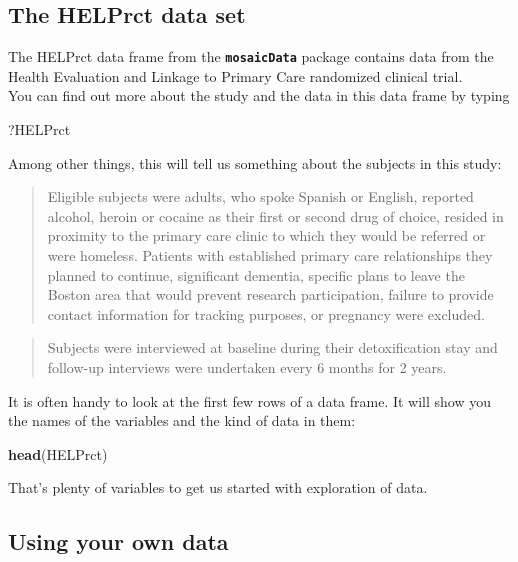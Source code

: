 \documentclass[]{book}
\newenvironment{Shaded}{\begin{snugshade}}{\end{snugshade}}
\newcommand{\KeywordTok}[1]{\textcolor[rgb]{0.13,0.29,0.53}{\textbf{#1}}}
\newcommand{\NormalTok}[1]{#1}
\begin{document}
\hypertarget{the-helprct-data-set}{%
\subsection{The HELPrct data set}\label{the-helprct-data-set}}

The {HELPrct} data frame from the \textbf{\texttt{mosaicData}} package contains data from the
Health Evaluation and Linkage to Primary Care randomized clinical trial.\\
You can find out more about the study and the data in this data frame by typing

\begin{Shaded}
\begin{Highlighting}[]
\NormalTok{?HELPrct}
\end{Highlighting}
\end{Shaded}

Among other things, this will tell us something about the subjects in this study:

\begin{quote}
Eligible subjects were adults, who spoke Spanish or English, reported
alcohol, heroin or cocaine as their first or second drug of choice, resided
in proximity to the primary care clinic to which they would be referred or
were homeless. Patients with established primary care relationships they
planned to continue, significant dementia, specific plans to leave the
Boston area that would prevent research participation, failure to provide
contact information for tracking purposes, or pregnancy were excluded.
\end{quote}

\begin{quote}
Subjects were interviewed at baseline during their detoxification stay and
follow-up interviews were undertaken every 6 months for 2 years.
\end{quote}

It is often handy to look at the first few rows of a data frame. It will show you the names of the variables and the kind of data in them:

\begin{Shaded}
\begin{Highlighting}[]
\KeywordTok{head}\NormalTok{(HELPrct)}
\end{Highlighting}
\end{Shaded}

That's plenty of variables to get us started with exploration of data.

\hypertarget{using-your-own-data}{%
\subsection{Using your own data}\label{using-your-own-data}}
\end{document}
